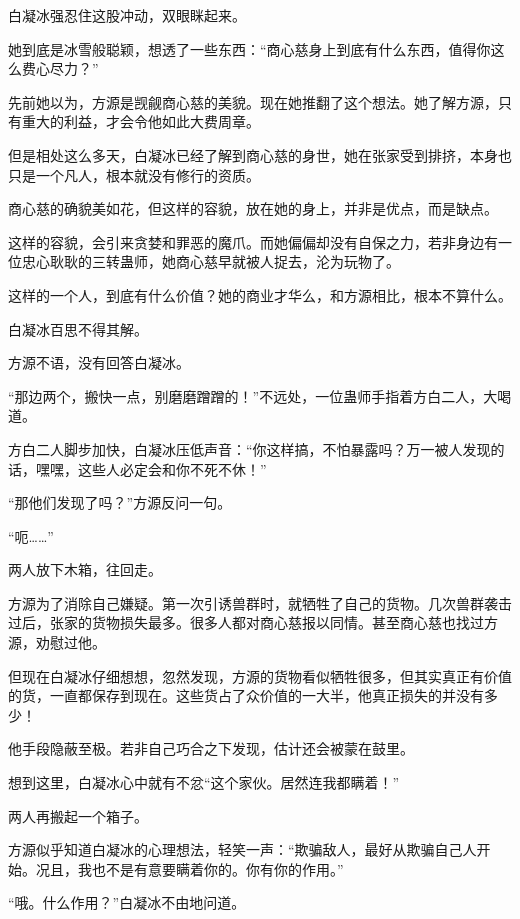 
\begin{this_body}

白凝冰强忍住这股冲动，双眼眯起来。

她到底是冰雪般聪颖，想透了一些东西：“商心慈身上到底有什么东西，值得你这么费心尽力？”

先前她以为，方源是觊觎商心慈的美貌。现在她推翻了这个想法。她了解方源，只有重大的利益，才会令他如此大费周章。

但是相处这么多天，白凝冰已经了解到商心慈的身世，她在张家受到排挤，本身也只是一个凡人，根本就没有修行的资质。

商心慈的确貌美如花，但这样的容貌，放在她的身上，并非是优点，而是缺点。

这样的容貌，会引来贪婪和罪恶的魔爪。而她偏偏却没有自保之力，若非身边有一位忠心耿耿的三转蛊师，她商心慈早就被人捉去，沦为玩物了。

这样的一个人，到底有什么价值？她的商业才华么，和方源相比，根本不算什么。

白凝冰百思不得其解。

方源不语，没有回答白凝冰。

“那边两个，搬快一点，别磨磨蹭蹭的！”不远处，一位蛊师手指着方白二人，大喝道。

方白二人脚步加快，白凝冰压低声音：“你这样搞，不怕暴露吗？万一被人发现的话，嘿嘿，这些人必定会和你不死不休！”

“那他们发现了吗？”方源反问一句。

“呃……”

两人放下木箱，往回走。

方源为了消除自己嫌疑。第一次引诱兽群时，就牺牲了自己的货物。几次兽群袭击过后，张家的货物损失最多。很多人都对商心慈报以同情。甚至商心慈也找过方源，劝慰过他。

但现在白凝冰仔细想想，忽然发现，方源的货物看似牺牲很多，但其实真正有价值的货，一直都保存到现在。这些货占了众价值的一大半，他真正损失的并没有多少！

他手段隐蔽至极。若非自己巧合之下发现，估计还会被蒙在鼓里。

想到这里，白凝冰心中就有不忿“这个家伙。居然连我都瞒着！”

两人再搬起一个箱子。

方源似乎知道白凝冰的心理想法，轻笑一声：“欺骗敌人，最好从欺骗自己人开始。况且，我也不是有意要瞒着你的。你有你的作用。”

“哦。什么作用？”白凝冰不由地问道。


\end{this_body}
